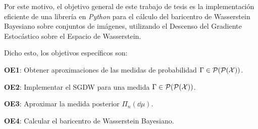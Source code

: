 Por este motivo, el objetivo general de este trabajo de tesis es la implementación eficiente de una librería en \emph{Python} para el cálculo del baricentro de Wasserstein Bayesiano sobre conjuntos de imágenes, utilizando el Descenso del Gradiente Estocástico sobre el Espacio de Wasserstein.

Dicho esto, los objetivos específicos son:
\begin{myitemize}
	\item \textbf{OE1}: Obtener aproximaciones de las medidas de probabilidad $\Gamma \in \ProbSpace[\ProbSpace[\cX]]$.
	\item \textbf{OE2}: Implementar el SGDW para una medida $\Gamma \in \ProbSpace[\ProbSpace[\cX]]$.
	\item \textbf{OE3}: Aproximar la medida posterior $\Pi_n(\dd \mu)$.
	\item \textbf{OE4}: Calcular el baricentro de Wasserstein Bayesiano.
\end{myitemize}
